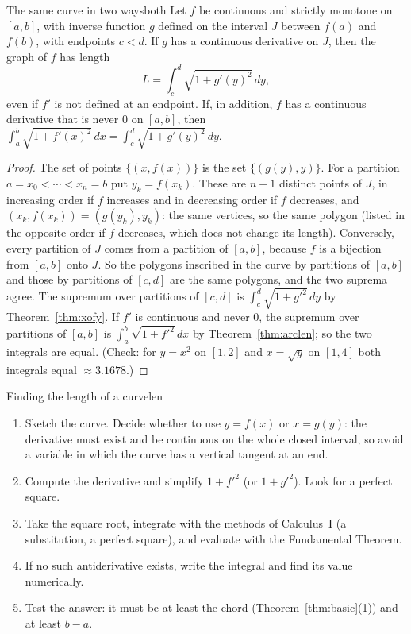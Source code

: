 \documentclass[11pt]{article}
\begin{document}
\begin{thm}{The same curve in two ways}{both}
Let $f$ be continuous and strictly monotone on $[a,b]$, with inverse function $g$ defined on the interval $J$ between $f(a)$ and $f(b)$, with endpoints $c<d$. If $g$ has a continuous derivative on $J$, then the graph of $f$ has length
\[
L=\int_c^d\sqrt{1+g'(y)^2}\,dy ,
\]
even if $f'$ is not defined at an endpoint. If, in addition, $f$ has a continuous derivative that is never $0$ on $[a,b]$, then
$\displaystyle\int_a^b\sqrt{1+f'(x)^2}\,dx=\int_c^d\sqrt{1+g'(y)^2}\,dy .$
\end{thm}
\begin{proof}
The set of points $\{(x,f(x))\}$ is the set $\{(g(y),y)\}$. For a partition $a=x_0<\cdots<x_n=b$ put $y_k=f(x_k)$. These are $n+1$ distinct points of $J$, in increasing order if $f$ increases and in decreasing order if $f$ decreases, and $(x_k,f(x_k))=(g(y_k),y_k)$: the same vertices, so the same polygon (listed in the opposite order if $f$ decreases, which does not change its length). Conversely, every partition of $J$ comes from a partition of $[a,b]$, because $f$ is a bijection from $[a,b]$ onto $J$. So the polygons inscribed in the curve by partitions of $[a,b]$ and those by partitions of $[c,d]$ are the same polygons, and the two suprema agree. The supremum over partitions of $[c,d]$ is $\int_c^d\sqrt{1+g'^2}\,dy$ by Theorem~\ref{thm:xofy}. If $f'$ is continuous and never $0$, the supremum over partitions of $[a,b]$ is $\int_a^b\sqrt{1+f'^2}\,dx$ by Theorem~\ref{thm:arclen}; so the two integrals are equal. (Check: for $y=x^2$ on $[1,2]$ and $x=\sqrt y$ on $[1,4]$ both integrals equal $\approx3.1678$.)
\end{proof}

\begin{proc}{Finding the length of a curve}{len}
\begin{enumerate}[nosep]
  \item Sketch the curve. Decide whether to use $y=f(x)$ or $x=g(y)$: the derivative must exist and be continuous on the whole closed interval, so avoid a variable in which the curve has a vertical tangent at an end.
  \item Compute the derivative and simplify $1+f'^2$ (or $1+g'^2$). Look for a perfect square.
  \item Take the square root, integrate with the methods of Calculus~I (a substitution, a perfect square), and evaluate with the Fundamental Theorem.
  \item If no such antiderivative exists, write the integral and find its value numerically.
  \item Test the answer: it must be at least the chord (Theorem~\ref{thm:basic}(1)) and at least $b-a$.
\end{enumerate}
\end{proc}
\end{document}
